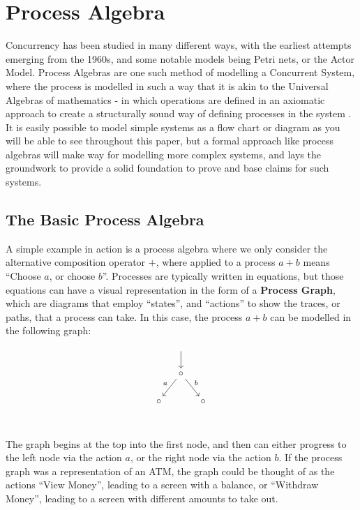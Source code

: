 \documentclass[../hons_project.tex]{subfiles}
\begin{document}
\section{Process Algebra}
Concurrency has been studied in many different ways, with the earliest attempts emerging from the 1960s, and some notable models being Petri nets, or the Actor Model. Process Algebras are one such method of modelling a Concurrent System, where the process is modelled in such a way that it is akin to the Universal Algebras of mathematics - in which operations are defined in an axiomatic approach to create a structurally sound way of defining processes in the system \citep{baetenBriefHistoryProcess2005}. It is easily possible to model simple systems as a flow chart or diagram as you will be able to see throughout this paper, but a formal approach like process algebras will make way for modelling more complex systems, and lays the groundwork to provide a solid foundation to prove and base claims for such systems.

\subsection{The Basic Process Algebra}
A simple example in action is a process algebra where we only consider the alternative composition operator $+$, where applied to a process $a + b$ means ``Choose $a$, or choose $b$''. Processes are typically written in equations, but those equations can have a visual representation in the form of a \textbf{Process Graph}, which are diagrams that employ ``states'', and ``actions'' to show the traces, or paths, that a process can take. In this case, the process $a + b$ can be modelled in the following graph:

\begin{equation}
\begin{tikzcd}[cramped,column sep=small]
		& {} \\
		& \circ \\
		\circ && \circ \\
		\arrow[from=1-2, to=2-2]
		\arrow["a"', from=2-2, to=3-1]
		\arrow["b", from=2-2, to=3-3]
	\end{tikzcd}
\end{equation}

The graph begins at the top into the first node, and then can either progress to the left node via the action $a$, or the right node via the action $b$. If the process graph was a representation of an ATM, the graph could be thought of as the actions ``View Money'', leading to a screen with a balance, or ``Withdraw Money'', leading to a screen with different amounts to take out.
\end{document}
